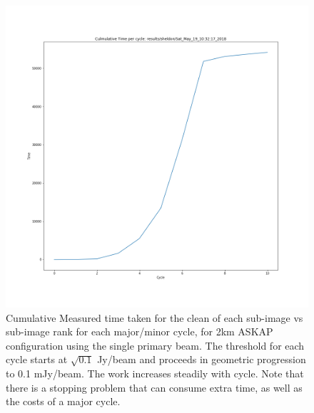 \documentclass[11pt,a4paper,variablewidth]{article}
\begin{document}
\begin{figure}[h]
  \centering
  \includegraphics[width=\textwidth]{./pngs/culm_time_per_cycle.png}
  \caption{Cumulative Measured time taken for the clean of each sub-image vs sub-image rank for each major/minor cycle, for 2km ASKAP configuration using the single primary beam. The threshold for each cycle starts at $\sqrt{0.1}$ Jy/beam and proceeds in geometric progression to 0.1 mJy/beam. The work increases steadily with cycle. Note that there is a stopping problem that can consume extra time, as well as the costs of a major cycle.}
  \label{fig:culm_time_vs_cycle}
\end{figure}
\end{document}
